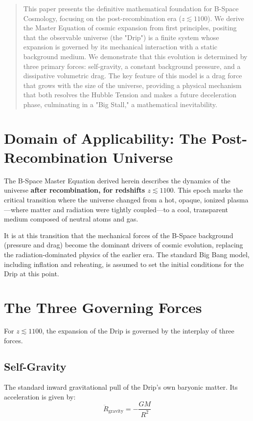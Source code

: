 \documentclass{BSpacePaper} %
\begin{document}
\makeBSCSsupplementtitle

\begin{abstract}
\noindent
This paper presents the definitive mathematical foundation for B-Space Cosmology, focusing on the post-recombination era ($z \lesssim 1100$). We derive the Master Equation of cosmic expansion from first principles, positing that the observable universe (the "Drip") is a finite system whose expansion is governed by its mechanical interaction with a static background medium. We demonstrate that this evolution is determined by three primary forces: self-gravity, a constant background pressure, and a dissipative volumetric drag. The key feature of this model is a drag force that grows with the size of the universe, providing a physical mechanism that both resolves the Hubble Tension and makes a future deceleration phase, culminating in a "Big Stall," a mathematical inevitability.
\end{abstract}

\section{Domain of Applicability: The Post-Recombination Universe}
The B-Space Master Equation derived herein describes the dynamics of the universe \textbf{after recombination, for redshifts $z \lesssim 1100$}. This epoch marks the critical transition where the universe changed from a hot, opaque, ionized plasma—where matter and radiation were tightly coupled—to a cool, transparent medium composed of neutral atoms and gas.

It is at this transition that the mechanical forces of the B-Space background (pressure and drag) become the dominant drivers of cosmic evolution, replacing the radiation-dominated physics of the earlier era. The standard Big Bang model, including inflation and reheating, is assumed to set the initial conditions for the Drip at this point.

\section{The Three Governing Forces}
For $z \lesssim 1100$, the expansion of the Drip is governed by the interplay of three forces.

\subsection{Self-Gravity}
The standard inward gravitational pull of the Drip's own baryonic matter. Its acceleration is given by:
\begin{equation}
    \ddot{R}_{\text{gravity}} = -\frac{GM}{R^2}
\end{equation}
\end{document}
